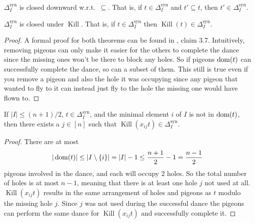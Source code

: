 \documentclass{article}
\newcommand{\Dsyn}{\Delta^\mathrm{syn}}
\renewcommand{\K}{\operatorname{Kill}}
\begin{document}
\begin{theorem} \label{closedsubset}
    $\Dsyn_I$ is closed downward w.r.t.\ $\subseteq$. That is, if $t \in \Dsyn_I$ and $t' \subseteq t$, then $t' \in \Dsyn_I$.
\end{theorem}
\begin{theorem} \label{closedkill}
    $\Dsyn_I$ is closed under $\K$. That is, if $t \in \Dsyn_I$ then $\K(t) \in \Dsyn_I$.
\end{theorem}
\begin{proof}
    A formal proof for both theorems can be found in \cite{raz}, claim 3.7. Intuitively, removing pigeons can only make it easier for the others to complete the dance since the missing ones won't be there to block any holes. So if pigeons $\operatorname{dom}(t)$ can successfully complete the dance, so can a subset of them. This still is true even if you remove a pigeon and also the hole it was occupying since any pigeon that wanted to fly to it can instead just fly to the hole the missing one would have flown to.
\end{proof}

\begin{theorem} \label{emptyhole}
    If $|I| \leq (n + 1) / 2$, $t \in \Dsyn_I$, and the minimal element $i$ of $I$ is not in $\operatorname{dom}(t)$, then there exists a $j \in [n]$ such that $\K(x_{i j} t) \in \Dsyn_I$.
\end{theorem}
\begin{proof}
    There are at most 
    $$|\operatorname{dom}(t)| \leq |I \setminus \{i\}| = |I| - 1 \leq \frac{n + 1}{2} - 1 = \frac{n - 1}{2}$$
    pigeons involved in the dance, and each will occupy $2$ holes. So the total number of holes is at most $n - 1$, meaning that there is at least one hole $j$ not used at all. $\K(x_{i j}t)$ results in the same arrangement of holes and pigeons as $t$ modulo the missing hole $j$. Since $j$ was not used during the successful dance the pigeons can perform the same dance for $\K(x_{i j}t)$ and successfully complete it.
\end{proof}
\end{document}
